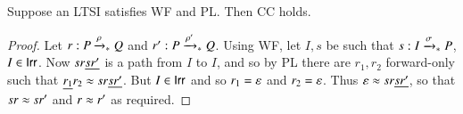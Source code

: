 \begin{proposition}\label{prop:PL WF CC}
  Suppose an LTSI satisfies WF and PL. 
  Then CC holds.
\end{proposition}
\begin{proof}
  Let $r:P \xrightarrow[]{\rho}_{*} Q$ and $r':P \xrightarrow[]{\rho'}_{*} Q$.
  Using WF, let $I,s$ be such that $s:I \xrightarrow[]{\sigma}_{*} P$, $I \in \mathsf{Irr}$.
  Now $sr\underline{sr'}$ is a path from $I$ to $I$,
  and so by PL there are $r_1,r_2$ forward-only such that $\underline{r_1}r_2 \approx sr\underline{sr'}$.
  But $I \in \mathsf{Irr}$ and so $r_1 = \varepsilon$ and $r_2 = \varepsilon$.
  Thus $\varepsilon \approx sr\underline{sr'}$, so that $sr \approx sr'$ and $r \approx r'$
  as required.
\end{proof}